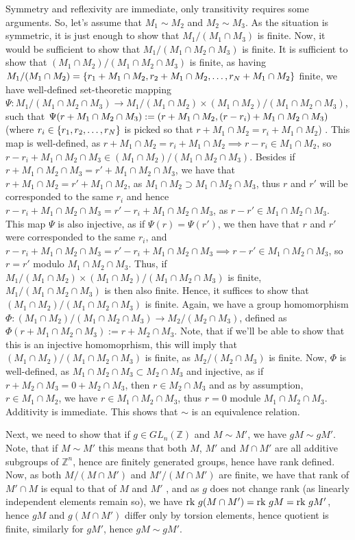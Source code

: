\documentclass[8pt,fleqn]{article} %
\begin{document}
\begin{enumerate}[label=\bfseries Problem \arabic*.]
		Symmetry and reflexivity are immediate, only transitivity requires some arguments. So, let's assume that $M_1\sim M_2$
		and $M_2\sim M_3$. As the situation is symmetric, it is just enough to show that $M_1/(M_1\cap M_3)$ is finite. Now, it
		would be sufficient to show that $M_1/(M_1\cap M_2\cap M_3)$ is finite. It is sufficient to show that $(M_1\cap M_2)/
		(M_1\cap M_2\cap M_3)$ is finite, as having $M_1/(M_1\cap M_2)=\left\{r_1+M_1\cap M_2,r_2 +M_1\cap M_2,\hdots,
		r_N+M_1\cap M_2\right\}$ finite, we have
		well-defined set-theoretic mapping $\Psi:M_1/(M_1\cap M_2\cap M_3)\to M_1/(M_1\cap M_2)\times (M_1\cap M_2)/(M_1\cap M_2\cap M_3)$,
		such that $\Psi(r+{M_1\cap M_2\cap M_3}):=\left(r+{M_1\cap M_2},(r-r_i)+{M_1\cap M_2\cap M_3}\right)$ (where $r_i\in\left\{
		r_1,r_2,\hdots,r_N\right\}$ is picked so that $r+M_1\cap M_2=r_i+M_1\cap M_2$)
		. This map is well-defined, as $r+M_1\cap M_2=r_i+M_1\cap M_2\implies r-r_i\in M_1\cap M_2$, so $r-r_i+M_1\cap M_2\cap M_3\in
		(M_1\cap M_2)/(M_1\cap M_2\cap M_3)$. Besides if $r+M_1\cap M_2\cap M_3=r'+M_1\cap M_2\cap M_3$, we have that
		$r+M_1\cap M_2=r'+M_1\cap M_2$, as $M_1\cap M_2\supset M_1\cap M_2\cap M_3$, thus $r$ and $r'$ will be corresponded to the same
		$r_i$ and hence $r-r_i+M_1\cap M_2\cap M_3=r'-r_i+M_1\cap M_2\cap M_3$, as $r-r'\in M_1\cap M_2\cap M_3$. This map $\Psi$ is
		also injective, as if $\Psi(r)=\Psi(r')$, we then have that $r$ and $r'$ were corresponded to the same $r_i$, and $
		r-r_i+M_1\cap M_2\cap M_3=r'-r_i+M_1\cap M_2\cap M_3\implies r-r'\in M_1\cap M_2\cap M_3$, so $r=r'$ modulo $M_1\cap M_2\cap M_3$.
		Thus, if $M_1/(M_1\cap M_2)\times (M_1\cap M_2)/(M_1\cap M_2\cap M_3)$ is finite, $M_1/(M_1\cap M_2\cap M_3)$ is then also
		finite. Hence, it suffices to show that $(M_1\cap M_2)/(M_1\cap M_2\cap M_3)$ is finite. Again, we have a group
		homomorphism $\Phi:(M_1\cap M_2)/(M_1\cap M_2\cap M_3)\to M_2/(M_2\cap M_3)$, defined as $\Phi(r+M_1\cap M_2\cap M_3):=
		r+M_2\cap M_3$. Note, that if we'll be able to show that this is an injective homomoprhism, this will imply that $(M_1\cap M_2)/
		(M_1\cap M_2\cap M_3)$ is finite, as $M_2/(M_2\cap M_3)$ is finite. Now, $\Phi$ is well-defined, as $M_1\cap M_2\cap M_3\subset
		M_2\cap M_3$ and injective, as if $r+M_2\cap M_3=0+M_2\cap M_3$, then $r\in M_2\cap M_3$ and as by assumption, $r\in M_1\cap M_2$,
		we have $r\in M_1\cap M_2\cap M_3$, thus $r=0$ module $M_1\cap M_2\cap M_3$. Additivity is immediate. This shows that $\sim$ is
		an equivalence relation.

		Next, we need to show that if $g\in GL_n(\mathbb{Z})$ and $M\sim M'$, we have $gM\sim gM'$. Note, that if $M\sim M'$ this
		means that both $M$, $M'$ and $M\cap M'$
		are all additive subgroups of $\mathbb{Z}^n$, hence are finitely generated groups, hence have rank
		defined. Now, as both $M/(M\cap M')$ and $M'/(M\cap M')$ are finite, we have that rank of $M'\cap M$ is equal to that of $M$ and $M'$
		, and as $g$ does not change rank (as linearly independent elements remain so), we have $\mbox{rk } g(M\cap M')=\mbox{rk } gM=\mbox{rk } gM'$, hence
		$gM$ and $g(M\cap M')$ differ only by torsion elements, hence quotient is finite, similarly for $gM'$, hence $gM\sim gM'$.


\end{enumerate}
\end{document}

